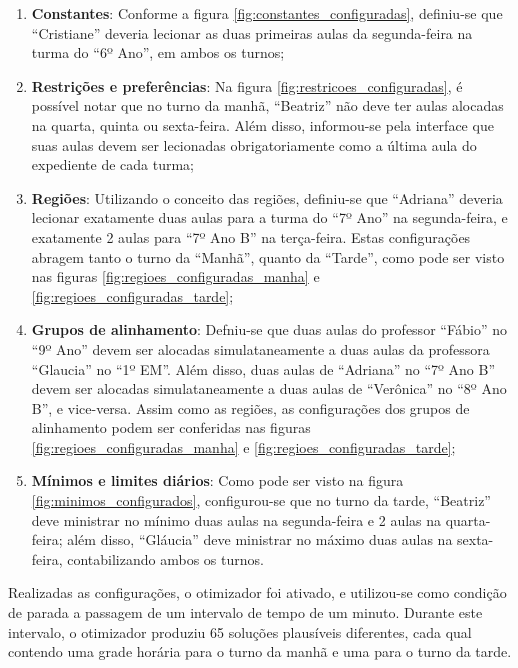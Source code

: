 \newpage
\begin{enumerate}
	\item \label{item_constantes} \textbf{Constantes}: Conforme a figura \ref{fig:constantes_configuradas}, definiu-se que ``Cristiane'' deveria lecionar as duas primeiras aulas da segunda-feira na turma do ``6º Ano'', em ambos os turnos;
	\item \label{item_restricoes} \textbf{Restrições e preferências}: Na figura \ref{fig:restricoes_configuradas}, é possível notar que no turno da manhã, ``Beatriz'' não deve ter aulas alocadas na quarta, quinta ou sexta-feira. Além disso, informou-se pela interface que suas aulas devem ser lecionadas obrigatoriamente como a última aula do expediente de cada turma;
	\item \label{item_regioes} \textbf{Regiões}: Utilizando o conceito das regiões, definiu-se que ``Adriana'' deveria lecionar exatamente duas aulas para a turma do ``7º Ano'' na segunda-feira, e exatamente 2 aulas para ``7º Ano B'' na terça-feira. Estas configurações abragem tanto o turno da ``Manhã'', quanto da ``Tarde'', como pode ser visto nas figuras \ref{fig:regioes_configuradas_manha} e \ref{fig:regioes_configuradas_tarde};
	\item \label{item_grupos} \textbf{Grupos de alinhamento}: Defniu-se que duas aulas do professor ``Fábio'' no ``9º Ano'' devem ser alocadas simulataneamente a duas aulas da professora ``Glaucia'' no ``1º EM''. Além disso, duas aulas de ``Adriana'' no ``7º Ano B'' devem ser alocadas simulataneamente a duas aulas de ``Verônica'' no ``8º Ano B'', e vice-versa. Assim como as regiões, as configurações dos grupos de alinhamento podem ser conferidas nas figuras \ref{fig:regioes_configuradas_manha} e \ref{fig:regioes_configuradas_tarde};
	\item \label{item_minimos} \textbf{Mínimos e limites diários}: Como pode ser visto na figura \ref{fig:minimos_configurados}, configurou-se que no turno da tarde, ``Beatriz'' deve ministrar no mínimo duas aulas na segunda-feira e 2 aulas na quarta-feira; além disso, ``Gláucia'' deve ministrar no máximo duas aulas na sexta-feira, contabilizando ambos os turnos.
\end{enumerate}

Realizadas as configurações, o otimizador foi ativado, e utilizou-se como condição de parada a passagem de um intervalo de tempo de um minuto. Durante este intervalo, o otimizador produziu 65 soluções plausíveis diferentes, cada qual contendo uma grade horária para o turno da manhã e uma para o turno da tarde.

